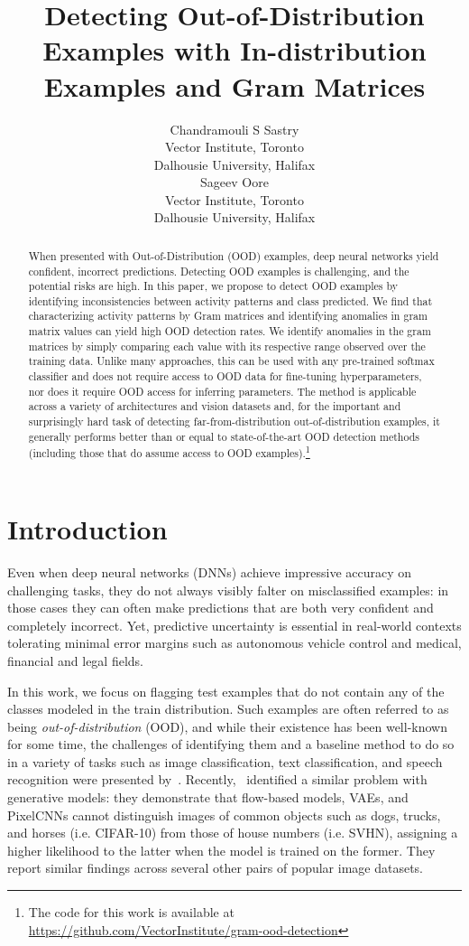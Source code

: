 \documentclass{article}
\title{Detecting Out-of-Distribution Examples with In-distribution Examples and Gram Matrices}
\author{Chandramouli S Sastry\\
Vector Institute,
Toronto\\
Dalhousie University, Halifax\\
\And
Sageev Oore\\
Vector Institute,
Toronto\\
Dalhousie University, Halifax\\
}
\begin{document}
\maketitle

\begin{abstract}
  When presented with Out-of-Distribution (OOD) examples, deep neural networks yield confident, incorrect predictions. Detecting OOD examples is challenging, and the potential risks are high. In this paper, we propose to detect OOD examples by identifying inconsistencies between activity patterns and class predicted. We find that characterizing activity patterns by Gram matrices and identifying anomalies in gram matrix values can yield high OOD detection rates. We identify anomalies in the gram matrices by simply comparing each value with its respective range observed over the training data. Unlike many approaches, this can be used with any pre-trained softmax classifier and does not require access to OOD data for fine-tuning hyperparameters, nor does it require OOD access for inferring parameters. The method is applicable across a variety of architectures and vision datasets and, for the important and surprisingly hard task of detecting far-from-distribution out-of-distribution examples, it generally performs better than or equal to state-of-the-art OOD detection methods (including those that do assume access to OOD examples).\footnote{The code for this work is available at \url{https://github.com/VectorInstitute/gram-ood-detection}}

\end{abstract}

\section{Introduction}


Even when deep neural networks (DNNs) achieve impressive accuracy on challenging tasks, they do not always visibly falter on misclassified examples: in those cases they can often make predictions that are both very confident and completely incorrect. Yet, predictive uncertainty is essential in real-world contexts tolerating minimal error margins such as autonomous vehicle control and medical, financial and legal fields.

In this work, we focus on flagging test examples that do not contain any of the classes modeled in the train distribution. Such examples are often referred to as being {\it out-of-distribution} (OOD), and while their existence has been well-known for some time, the challenges of identifying them and a baseline method to do so in a variety of tasks such as image classification, text classification, and speech recognition were presented by~\cite{hendrycks2016baseline}. Recently,~\cite{nalisnick2018do} identified a similar problem with generative models: they demonstrate that flow-based models, VAEs, and PixelCNNs cannot distinguish images of common objects such as dogs, trucks, and horses (i.e. CIFAR-10) from those of house numbers (i.e. SVHN), assigning a higher likelihood to the latter when the model is trained on the former. They report similar findings across several other pairs of popular image datasets.
\end{document}

